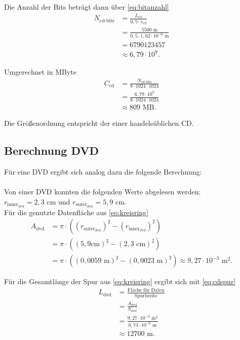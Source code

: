 \documentclass[9pt,twocolumn,twoside]{pnas-new}
\begin{document}
Die Anzahl der Bits beträgt dann über \eqref{eq:bitanzahl}
\begin{align*}
N_{\mbox{cd-bits}} &=  \frac{L_{\mbox{cd}}}{0,5\cdot s_{\mbox{cd}}}\\
&= \frac{5500\mbox{ m}}{0,5 \cdot 1,62 \cdot 10^{-6}\mbox{ m}}\\
&= 6790123457 \\
&\approx 6,79 \cdot 10^9.
\end{align*}

Umgerechnet in MByte
\begin{align*}
C_{\mbox{cd}} &= \frac{N_{\mbox{cd-bits}}}{8\cdot1024\cdot1024}\\
&= \frac{ 6,79\cdot10^9}{8\cdot1024\cdot1024}\\
&\approx 809\mbox{ MB}.
\end{align*}

Die Größenordnung entspricht der einer handelsüblichen CD.

\subsection{Berechnung DVD}
Für eine DVD ergibt sich analog dazu die folgende Berechnung: \\ \\
Von einer DVD konnten die folgenden Werte abgelesen werden: \begin{math} r_{\mbox{inner}_{\mbox{dvd}}} = 2,3 \mbox{ cm und } r_{\mbox{outer}_{\mbox{dvd}}} = 5,9 \mbox{ cm} \end{math}. \\

Für die genutzte Datenfläche aus \eqref{eq:kreisring}
\begin{align*}
 A_{\mbox{dvd}} &= \pi\cdot((r_{\mbox{outer}_{\mbox{dvd}}})^2-(r_{\mbox{inner}_{\mbox{dvd}}})^2)  \\	
&= \pi\cdot((5,9\mbox{cm})^2-(2,3\mbox{ cm})^2) \\
 &=  \pi\cdot((0,0059\mbox{ m})^2-(0,0023\mbox{ m})^2) \approx 9,27\cdot10^{-3}\mbox{ m}^2.
\end{align*}

Für die Gesamtlänge der Spur aus \eqref{eq:kreisring} ergibt sich mit \eqref{eq:cdspur}
\begin{align*}
 L_{\mbox{dvd}} &= \frac{\mbox{Fläche für Daten}}{\mbox{Spurbreite}}\\
 &= \frac{A_{\mbox{dvd}}}{S_{\mbox{dvd}}}\\
 &= \frac{9,27\cdot10^{-3}\mbox{ m}^2}{0,73\cdot10^{-6}\mbox{ m} }\\
 &\approx 12700\mbox{ m}.
\end{align*}
\end{document}
